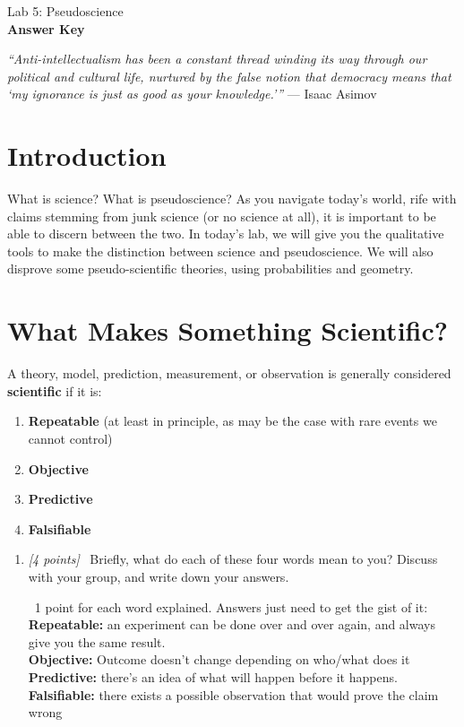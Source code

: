 \documentclass[11pt]{article}
\newcommand{\pts}[1]{\textit{[#1 points]}\ }
\newcommand{\ans}[1]{%
  \par\smallskip\noindent{\color{blue!55!black}\textbf{Answer:}}\ #1\par\smallskip}
\begin{document}
\begin{center}
\huge{Lab 5: Pseudoscience}\\[4pt]
\Large\textbf{Answer Key}
\end{center}

\bigskip
\noindent\textit{``Anti-intellectualism has been a constant thread winding its
way through our political and cultural life, nurtured by the false notion
that democracy means that `my ignorance is just as good as your
knowledge.'''} --- Isaac Asimov

\section{Introduction}
What is science? What is pseudoscience? As you navigate today's world, rife with claims stemming from junk science (or no science at all), it is important to be able to discern between the two. In today's lab, we will give you the qualitative tools to make the distinction between science and pseudoscience. We will also disprove some pseudo-scientific theories, using probabilities and geometry.

\section{What Makes Something Scientific?}
\label{sec:what_makes_something_scientific}
A theory, model, prediction, measurement, or observation is generally
considered \textbf{scientific} if it is:
\begin{enumerate}[label=(\alph*)]
    \item \textbf{Repeatable} (at least in principle, as may be the case with rare events we cannot control)
    \item \textbf{Objective}
    \item \textbf{Predictive}
    \item \textbf{Falsifiable}
\end{enumerate}
\begin{enumerate}
    \item \pts{4} Briefly, what do each of these four words mean to you? Discuss with your group, and write down your answers.

    \ans{1 point for each word explained. Answers just need to get the gist of it:
    \\
    \textbf{Repeatable:} an experiment can be done over and over again, and always give you the same result. \\
    
    \textbf{Objective:} Outcome doesn't change depending on who/what does it \\
    
    \textbf{Predictive:} there's an idea of what will
    happen before it happens. \\
    
    \textbf{Falsifiable:} there exists a possible observation that
    would prove the claim wrong}


\end{enumerate}
\end{document}
